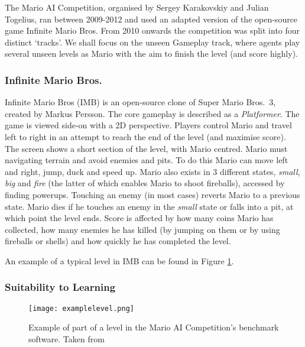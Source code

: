 The Mario AI Competition, organised by Sergey Karakovskiy and Julian Togelius, ran between 2009-2012 and used an adapted version of the open-source game Infinite Mario Bros. From 2010 onwards the competition was split into four distinct `tracks'. We shall focus on the unseen Gameplay track, where agents play several unseen levels as Mario with the aim to finish the level (and score highly). \cite{marioaicomp} \cite{2012the}

\subsubsection*{\hspace{6pt}Infinite Mario Bros.}

Infinite Mario Bros (IMB) \cite{imb} is an open-source clone of Super Mario Bros.~3, created by Markus Persson. The core gameplay is described as a \emph{Platformer}. The game is viewed side-on with a 2D perspective. Players control Mario and travel left to right in an attempt to reach the end of the level (and maximise score). The screen shows a short section of the level, with Mario centred. Mario must navigating terrain and avoid enemies and pits. To do this Mario can move left and right, jump, duck and speed up. Mario also exists in 3 different states, \emph{small}, \emph{big} and \emph{fire} (the latter of which enables Mario to shoot fireballs), accessed by finding powerups. Touching an enemy (in most cases) reverts Mario to a previous state. Mario dies if he touches an enemy in the \emph{small} state or falls into a pit, at which point the level ends. Score is affected by how many coins Mario has collected, how many enemies he has killed (by jumping on them or by using fireballs or shells) and how quickly he has completed the level. \cite[p.~3]{2012the}

An example of a typical level in IMB can be found in Figure \ref{fig:xmpllevel}.

\subsubsection*{\hspace{6pt}Suitability to Learning}

\begin{figure}[t]
	\begin{adjustwidth}{-0cm}{-0cm}
    \centering
    \texttt{[image: examplelevel.png]}
    \caption{Example of part of a level in the Mario AI Competition's benchmark software. Taken from \cite[p.~6]{2012the}}
    \label{fig:xmpllevel}
    \end{adjustwidth}
\end{figure}

